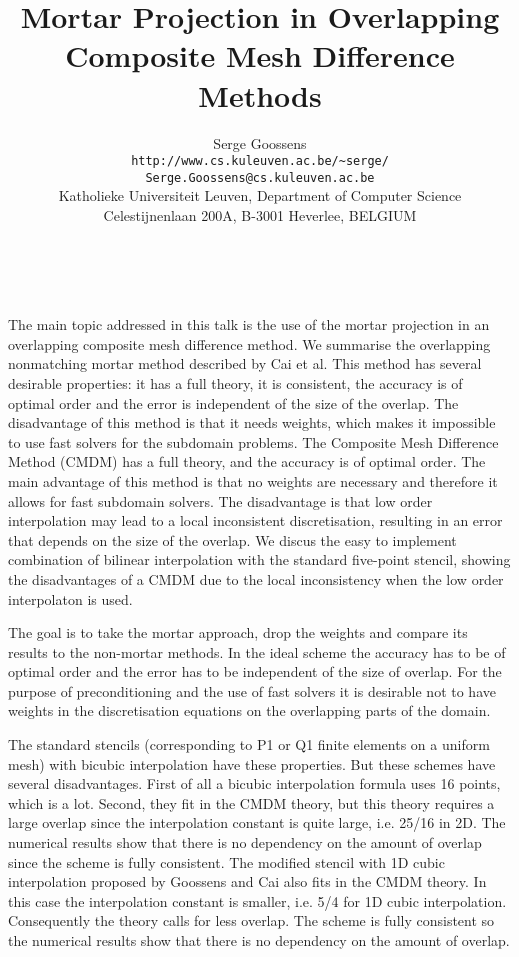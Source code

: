 \documentclass[11pt]{article}
\date{ ~ \hspace{-4mm}}
\title{Mortar Projection in Overlapping Composite Mesh Difference Methods  }
\author{Serge Goossens \\ {\tt http://www.cs.kuleuven.ac.be/\~{}serge/} \\ {\tt Serge.Goossens@cs.kuleuven.ac.be} \\ Katholieke Universiteit Leuven, Department of Computer Science  \\  Celestijnenlaan 200A, B-3001 Heverlee, BELGIUM}
\begin{document}
\maketitle
\thispagestyle{empty}




 


The main topic addressed in this talk is the use of the mortar projection
in an overlapping composite mesh difference method.  We summarise the
overlapping nonmatching mortar method described by Cai et al.  This method
has several desirable properties: it has a full theory, it is consistent,
the accuracy is of optimal order and the error is independent of the size
of the overlap.  The disadvantage of this method is that it needs weights,
which makes it impossible to use fast solvers for the subdomain problems.
The Composite Mesh Difference Method (CMDM) has a full theory, and the
accuracy is of optimal order.  The main advantage of this method is that no
weights are necessary and therefore it allows for fast subdomain solvers.
The disadvantage is that low order interpolation may lead to a local
inconsistent discretisation, resulting in an error that depends on the size
of the overlap.  We discus the easy to implement combination of bilinear
interpolation with the standard five-point stencil, showing the
disadvantages of a CMDM due to the local inconsistency when the low order
interpolaton is used.  



The goal is to take the mortar approach, drop the weights and compare its
results to the non-mortar methods.  In the ideal scheme the accuracy has to
be of optimal order and the error has to be independent of the size of
overlap.  For the purpose of preconditioning and the use of fast solvers it
is desirable not to have weights in the discretisation equations on the
overlapping parts of the domain.



The standard stencils (corresponding to P1 or Q1 finite elements on a
uniform mesh) with bicubic interpolation have these properties.  But these
schemes have several disadvantages.  First of all a bicubic interpolation
formula uses 16 points, which is a lot.  Second, they fit in the CMDM
theory, but this theory requires a large overlap since the interpolation
constant is quite large, i.e. 25/16 in 2D.  The numerical results show that
there is no dependency on the amount of overlap since the scheme is fully
consistent.  The modified stencil with 1D cubic interpolation proposed by
Goossens and Cai also fits in the CMDM theory.  In this case the
interpolation constant is smaller, i.e. 5/4 for 1D cubic interpolation.
Consequently the theory calls for less overlap.  The scheme is fully
consistent so the numerical results show that there is no dependency on the
amount of overlap.
\end{document}
